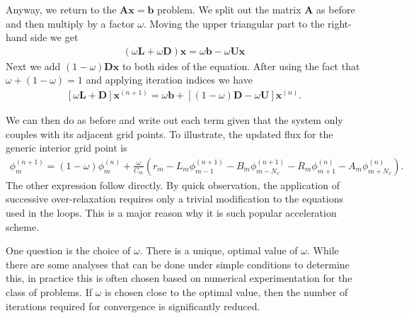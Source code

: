Anyway, we return to the $\mathbf{Ax} = \mathbf{b}$ problem. We split out the matrix $\mathbf{A}$ as before and then multiply by a factor $\omega$. Moving the upper triangular part to the right-hand side we get
\begin{align}
   \left( \omega \mathbf{L} + \omega  \mathbf{D} \right) \mathbf{x} = \omega \mathbf{b} - \omega \mathbf{U x }
\end{align}
Next we add $( 1 - \omega ) \mathbf{D x}$ to both sides of the equation. After using the fact that $\omega + ( 1 - \omega ) = 1$ and applying iteration indices we have
\begin{align}
   \left[ \omega \mathbf{L} + \mathbf{D} \right] \mathbf{x}^{(n+1)} = \omega  \mathbf{b} + \left[ ( 1 - \omega ) \mathbf{D} - \omega \mathbf{U} \right] \mathbf{ x }^{(n)} .
\end{align}

We can then do as before and write out each term given that the system only couples with its adjacent grid points. To illustrate, the updated flux for the generic interior grid point is
\begin{align}
  \phi_m^{(n+1)} = ( 1 - \omega ) \phi_m^{(n)} +  \frac{\omega}{C_m} \left( r_m - L_m \phi_{m-1}^{(n+1)} - B_m \phi_{m-N_x}^{(n+1)} - R_{m} \phi_{m+1}^{(n)} - A_{m} \phi_{m+N_x}^{(n)} \right) .
\end{align}
The other expression follow directly. By quick observation, the application of successive over-relaxation requires only a trivial modification to the equations used in the loops. This is a major reason why it is such popular acceleration scheme.

One question is the choice of $\omega$. There is a unique, optimal value of $\omega$. While there are some analyses that can be done under simple conditions to determine this, in practice this is often chosen based on numerical experimentation for the class of problems. If $\omega$ is chosen close to the optimal value, then the number of iterations required for convergence is significantly reduced.

